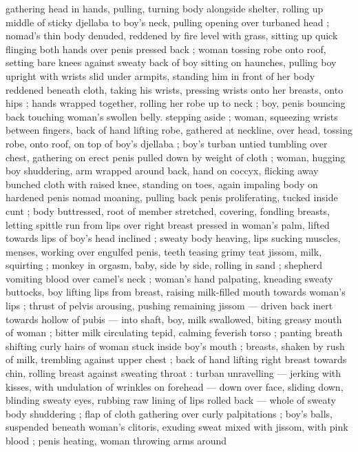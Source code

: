 gathering head in hands, pulling, turning body alongside shelter, 
rolling up middle of sticky djellaba to boy's neck, pulling opening 
over turbaned head ; nomad's thin body denuded, reddened by fire 
level with grass, sitting up quick flinging both hands over penis 
pressed back ; woman tossing robe onto roof, setting bare knees 
against sweaty back of boy sitting on haunches, pulling boy upright 
with wrists slid under armpits, standing him in front of her body 
reddened beneath cloth, taking his wrists, pressing wrists onto her 
breasts, onto hips ; hands wrapped together, rolling her robe up to 
neck ; boy, penis bouncing back touching woman's swollen belly. 
stepping aside ; woman, squeezing wrists between fingers, back of 
hand lifting robe, gathered at neckline, over head, tossing robe, onto 
roof, on top of boy's djellaba ; boy's turban untied tumbling over 
chest, gathering on erect penis pulled down by weight of cloth ;
woman, hugging boy shuddering, arm wrapped around back, hand on 
coccyx, flicking away bunched cloth with raised knee, standing on 
toes, again impaling body on hardened penis {\col} nomad moaning,
pulling back {\col} penis proliferating, tucked inside cunt ; body 
buttressed, root of member stretched, covering, fondling breasts, 
letting spittle run from lips over right breast pressed in woman's 
palm, lifted towards lips of boy's head inclined ; sweaty body 
heaving, lips sucking {\col} muscles, menses, working over engulfed 
penis, teeth teasing grimy teat {\col} jissom, milk, squirting ; monkey in 
orgasm, baby, side by side, rolling in sand ; shepherd vomiting blood 
over camel's neck ; woman's hand palpating, kneading sweaty 
buttocks, boy lifting lips from breast, raising milk-filled mouth 
towards woman's lips ; thrust of pelvis arousing, pushing remaining 
jissom --- driven back inert towards hollow of pubis --- into shaft, 
boy, milk swallowed, biting greasy mouth of woman ; bitter milk 
circulating tepid, calming feverish torso ; panting breath shifting 
curly hairs of woman stuck inside boy's mouth ; breasts, shaken by 
rush of milk, trembling against upper chest ; back of hand lifting 
right breast towards chin, rolling breast against sweating throat : 
turban unravelling --- jerking with kisses, with undulation of wrinkles 
on forehead --- down over face, sliding down, blinding sweaty eyes, 
rubbing raw lining of lips rolled back --- whole of sweaty body 
shuddering ; flap of cloth gathering over curly palpitations ; boy's 
balls, suspended beneath woman's clitoris, exuding sweat mixed with 
jissom, with pink blood ; penis heating, woman throwing arms around 
